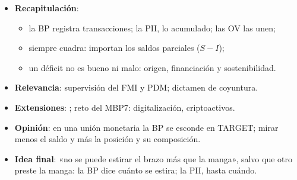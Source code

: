 \documentclass{article}
\begin{document}
\begin{columnas}
\begin{itemize}
\item \textbf{Recapitulación}:
  \begin{itemize}
  \item la BP registra transacciones; la PII, lo acumulado; las OV las unen;
  \item siempre cuadra: importan los saldos parciales ($S-I$);
  \item un déficit no es bueno ni malo: origen, financiación y sostenibilidad.
  \end{itemize}
\item \textbf{Relevancia}: supervisión del FMI y PDM; dictamen de coyuntura.
\item \textbf{Extensiones}:     ; reto del MBP7: digitalización, criptoactivos.
\item \textbf{Opinión}: en una unión monetaria la BP se esconde en TARGET; mirar menos el saldo y más la posición y su composición.
\item \textbf{Idea final}: «no se puede estirar el brazo más que la manga», salvo que otro preste la manga: la BP dice cuánto se estira; la PII, hasta cuándo.
\end{itemize}


\end{columnas}
\end{document}
